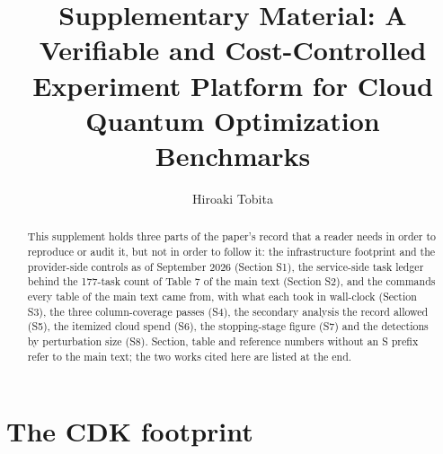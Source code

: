 \documentclass[acmsmall,screen,review]{acmart}
\begin{document}
\renewcommand{\thesection}{S\arabic{section}}\renewcommand{\thetable}{S\arabic{table}}\renewcommand{\thefigure}{S\arabic{figure}}

\title{Supplementary Material: A Verifiable and Cost-Controlled Experiment Platform for Cloud Quantum Optimization Benchmarks}
\author{Hiroaki Tobita}
\begin{abstract}
This supplement holds three parts of the paper's record that a reader needs in order to reproduce or audit it, but not in order to follow it: the infrastructure footprint and the provider-side controls as of September 2026 (Section S1), the service-side task ledger behind the 177-task count of Table 7 of the main text (Section S2), and the commands every table of the main text came from, with what each took in wall-clock (Section S3), the three column-coverage passes (S4), the secondary analysis the record allowed (S5), the itemized cloud spend (S6), the stopping-stage figure (S7) and the detections by perturbation size (S8). Section, table and reference numbers without an S prefix refer to the main text; the two works cited here are listed at the end.
\end{abstract}

\maketitle



\section{The CDK footprint}
\end{document}
